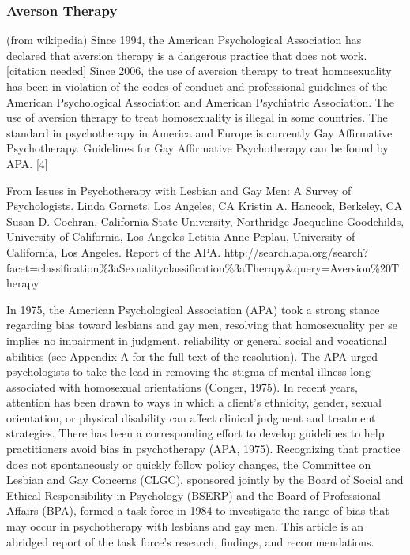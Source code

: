 \subsubsection{Averson Therapy}
\label{aversontherapy}

(from wikipedia) Since 1994, the American Psychological Association has declared that aversion therapy is a dangerous practice that does not work.[citation needed] Since 2006, the use of aversion therapy to treat homosexuality has been in violation of the codes of conduct and professional guidelines of the American Psychological Association and American Psychiatric Association. The use of aversion therapy to treat homosexuality is illegal in some countries. The standard in psychotherapy in America and Europe is currently Gay Affirmative Psychotherapy. Guidelines for Gay Affirmative Psychotherapy can be found by APA. [4]

From Issues in Psychotherapy with Lesbian and Gay Men: A Survey of Psychologists. Linda Garnets, Los Angeles, CA Kristin A. Hancock, Berkeley, CA Susan D. Cochran, California State University, Northridge Jacqueline Goodchilds, University of California, Los Angeles Letitia Anne Peplau, University of California, Los Angeles. Report of the APA. http:\slash \slash search.apa.org\slash search?facet=classification\%3aSexuality\textbar{}\textbar{}classification\%3aTherapy\&query=Aversion\%20Therapy

In 1975, the American Psychological Association (APA) took a strong stance regarding bias toward lesbians and gay men, resolving that homosexuality per se implies no impairment in judgment, reliability or general social and vocational abilities (see Appendix A for the full text of the resolution). The APA urged psychologists to take the lead in removing the stigma of mental illness long associated with homosexual orientations (Conger, 1975). In recent years, attention has been drawn to ways in which a client's ethnicity, gender, sexual orientation, or physical disability can affect clinical judgment and treatment strategies. There has been a corresponding effort to develop guidelines to help practitioners avoid bias in psychotherapy (APA, 1975). Recognizing that practice does not spontaneously or quickly follow policy changes, the Committee on Lesbian and Gay Concerns (CLGC), sponsored jointly by the Board of Social and Ethical Responsibility in Psychology (BSERP) and the Board of Professional Affairs (BPA), formed a task force in 1984 to investigate the range of bias that may occur in psychotherapy with lesbians and gay men. This article is an abridged report of the task force's research, findings, and recommendations.

